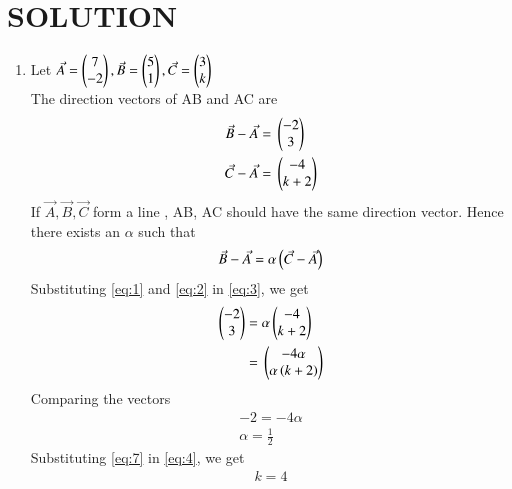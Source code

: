 \documentclass[journal,12pt,twocolumn]{IEEEtran}
\begin{document}
\section*{SOLUTION}
\begin{enumerate}
\item Let $\Vec{A}=\begin{pmatrix}7\\-2\end{pmatrix}, \Vec{B}=\begin{pmatrix}5 \\ 1\end{pmatrix}, \Vec{C}=\begin{pmatrix}3 \\ k\end{pmatrix}$\\
The direction vectors of AB and AC are
\begin{align}
\label{eq:1}
\Vec{B} - \Vec{A} ={}& \begin{pmatrix}-2 \\ 3\end{pmatrix}\\
\label{eq:2}
\Vec{C} - \Vec{A} ={}& \begin{pmatrix}-4 \\ k+2\end{pmatrix}
\end{align}
If $\Vec{A}, \Vec{B},\Vec{C} $ form a line , AB, AC should have the same direction vector. Hence there exists an $\alpha$  such that
\begin{align}
\label{eq:3}
\Vec{B} - \Vec{A}=\alpha \left(\Vec{C} - \Vec{A}\right)
\end{align}
Substituting \eqref{eq:1} and \eqref{eq:2} in \eqref{eq:3}, we get
\begin{align}
\label{eq:4}
\begin{pmatrix}-2 \\ 3\end{pmatrix}={}&\alpha \begin{pmatrix}-4 \\ k+2\end{pmatrix}\\
\label{eq:5}
={}&\begin{pmatrix}-4\alpha \\ \alpha\left(k+2\right)\end{pmatrix}
\end{align}
Comparing the vectors
\begin{align}
\label{eq:6}
-2=-4\alpha\\
\label{eq:7}
\alpha=\frac{1}{2}
\end{align}
Substituting \eqref{eq:7} in \eqref{eq:4}, we get 
\begin{align}
k=4
\end{align}


\end{enumerate}
\end{document}
